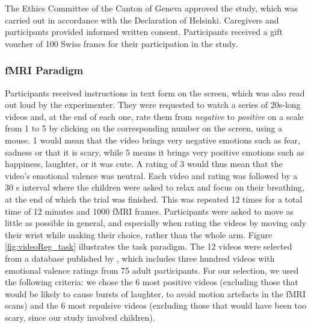 The Ethics Committee of the Canton of Geneva approved the study, which was carried out in accordance with the Declaration of Helsinki. Caregivers and participants provided informed written consent. Participants received a gift voucher of 100 Swiss francs for their participation in the study. 


\subsubsection{fMRI Paradigm} 
Participants received instructions in text form on the screen, which was also read out loud by the experimenter. They were requested to watch a series of 20s-long videos and, at the end of each one, rate them from \textit{negative} to \textit{positive} on a scale from 1 to 5 by clicking on the corresponding number on the screen, using a mouse. 1 would mean that the video brings very negative emotions such as fear, sadness or that it is scary, while 5 means it brings very positive emotions such as happiness, laughter, or it was cute. A rating of 3 would thus mean that the video's emotional valence was neutral. Each video and rating was followed by a 30 s interval where the children were asked to relax and focus on their breathing, at the end of which the trial was finished. This was repeated 12 times for a total time of 12 minutes and 1000 fMRI frames.  Participants were asked to move as little as possible in general, and especially when rating the videos by moving only their wrist while making their choice, rather than the whole arm. Figure \ref{fig:videoReg_task} illustrates the task paradigm. The 12 videos were selected from a database published by \citet{Samson2016}, which includes three hundred videos with emotional valence ratings from 75 adult participants. For our selection, we used the following criteria: we chose the 6 most positive videos (excluding those that would be likely to cause bursts of laughter, to avoid motion artefacts in the fMRI scans) and the 6 most repulsive videos (excluding those that would have been too scary, since our study involved children).


